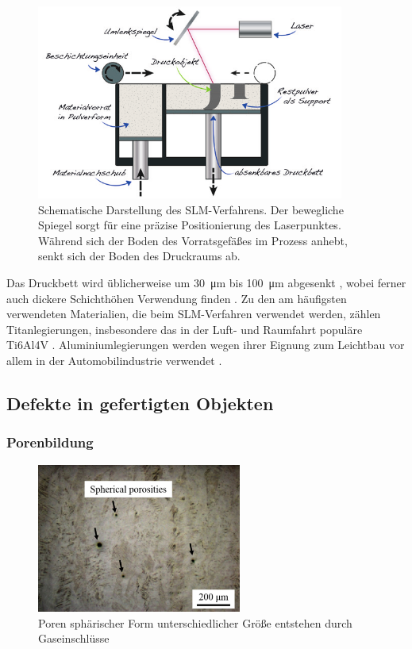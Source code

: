 		\begin{figure}[!ht]
			\centering
			\includegraphics[width=0.9\textwidth]{chapter/main/theory/img/sls_slm.png}
			\caption[Schematische Darstellung des SLM-Verfahrens]{Schematische Darstellung des
			SLM-Verfahrens. Der bewegliche Spiegel sorgt für eine präzise Positionierung des
			Laserpunktes. Während sich der Boden des Vorrats\-gefäßes im Prozess anhebt, senkt
			sich der Boden des Druckraums ab. \cite{horsch20143d}}
			\label{fig:slm_sls}
		\end{figure}

		Das Druckbett wird üblicherweise um \SI{30}{\micro\meter} bis \SI{100}{\micro\meter}
		abgesenkt \cite{song2012effects}, wobei ferner auch dickere Schichthöhen Verwendung finden
		\cite{shi2016performance}. Zu den am häufigsten verwendeten Materialien, die beim
		SLM-Verfahren verwendet werden, zählen Titanlegierungen, insbesondere das in der Luft- und
		Raumfahrt populäre Ti6Al4V \cite{song2012effects,shi2016performance,brandl2012morphology}.
		Aluminiumlegierungen werden wegen ihrer Eignung zum Leichtbau vor allem in der
		Automobilindustrie verwendet \cite{yan2020comparative,zou2017study}.

	\subsection{Defekte in gefertigten Objekten}
		\label{subsec:defects}
		\subsubsection{Porenbildung}
		\begin{figure}[!ht]
			\centering
			\includegraphics[width=0.6\textwidth]{chapter/main/theory/img/defects/porosities.png}
			\caption{Poren sphärischer Form unterschiedlicher Größe entstehen durch Gaseinschlüsse
			\cite{zhang2017defect}}
			\label{fig:defects_porosities}
		\end{figure}

